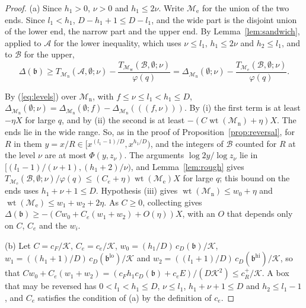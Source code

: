 \documentclass[11pt]{article}
\theoremstyle{definition}
\begin{document}
\begin{proof}
(a) Since $h_1 > 0$, $\nu > 0$ and $h_1 \le 2\nu$. Write $\mathcal M_{\mathrm e}$ for the union of the two ends. Since
$l_1 < h_1$, $D - h_1 + 1 \le D - l_1$, and the wide part is the disjoint union of the lower end, the narrow part and
the upper end. By Lemma~\ref{lem:sandwich}, applied to $\mathcal A$ for the lower inequality, which uses $\nu \le l_1$,
$h_1 \le 2\nu$ and $h_2 \le l_1$, and to $\mathcal B$ for the upper,
\[
  \Delta(\mathfrak b) \ge T_{\mathcal M_{\mathrm n}}(\mathcal A, \emptyset; \nu) - \frac{T_{\mathcal M_{\mathrm
  w}}(\mathcal B, \emptyset; \nu)}{\varphi(q)} = \Delta_{\mathcal M_{\mathrm n}}(\emptyset; \nu) - \frac{T_{\mathcal
  M_{\mathrm e}}(\mathcal B, \emptyset; \nu)}{\varphi(q)}.
\]

By (\ref{eq:levels}) over $\mathcal M_{\mathrm n}$, with $f \le \nu \le l_1 < h_1 \le D$, $\Delta_{\mathcal M_{\mathrm
n}}(\emptyset; \nu) = \Delta_{\mathcal M_{\mathrm n}}(\emptyset; f) - \Delta_{\mathcal M_{\mathrm n}}(((f, \nu)))$. By
(i) the first term is at least $-\eta X$ for large $q$, and by (ii) the second is at least $-(C
\operatorname{wt}(\mathcal M_{\mathrm n}) + \eta) X$. The ends lie in the wide range. So, as in the proof of
Proposition~\ref{prop:reversal}, for $R$ in them $y = x/R \in [x^{(l_1 - 1)/D}, x^{h_1/D})$, and the integers of
$\mathcal B$ counted for $R$ at the level $\nu$ are at most $\Phi(y, z_\nu)$. The arguments $\log 2y/\log z_\nu$ lie in
$[(l_1 - 1)/(\nu + 1), (h_1 + 2)/\nu)$, and Lemma~\ref{lem:rough} gives $T_{\mathcal M_{\mathrm e}}(\mathcal B,
\emptyset; \nu)/\varphi(q) \le (C_e + \eta) \operatorname{wt}(\mathcal M_{\mathrm e}) X$ for large $q$; this bound on
the ends uses $h_1 + \nu + 1 \le D$. Hypothesis (iii) gives $\operatorname{wt}(\mathcal M_{\mathrm n}) \le w_0 +
\eta$ and $\operatorname{wt}(\mathcal M_{\mathrm e}) \le w_1 + w_2 + 2\eta$. As $C \ge 0$, collecting gives
$\Delta(\mathfrak b) \ge -(C w_0 + C_e(w_1 + w_2) + O(\eta)) X$, with an $O$ that depends only on $C$, $C_e$ and the
$w_i$.

(b) Let $C = c_F/\mathcal K$, $C_e = c_e/\mathcal K$, $w_0 = (h_1/D)\, c_D(\mathfrak b)/\mathcal K$, $w_1 = ((h_1 +
1)/D)\, c_D(\mathfrak b^{\mathrm{lo}})/\mathcal K$ and $w_2 = ((l_1 + 1)/D)\, c_D(\mathfrak b^{\mathrm{hi}})/\mathcal
K$, so that $C w_0 + C_e(w_1 + w_2) = (c_F h_1 c_D(\mathfrak b) + c_e E)/(D\mathcal K^2) \le c_R^+/\mathcal K$. A box
that may be reversed has $0 < l_1 < h_1 \le D$, $\nu \le l_1$, $h_1 + \nu + 1 \le D$ and $h_2 \le l_1 - 1$, and $C_e$
satisfies the condition of (a) by the definition of $c_e$.


\end{proof}
\end{document}
